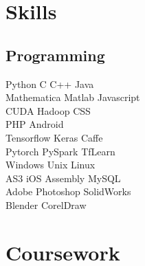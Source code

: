 \documentclass[]{deedy-resume-openfont}
\begin{document}
\begin{minipage}[t]{0.33\textwidth}

\section{Skills}
\subsection{Programming}
 \textbullet{} Python \textbullet{} C \textbullet{} C++ \textbullet{} Java \\

\textbullet{} Mathematica \textbullet{} Matlab \textbullet{} Javascript\\
\textbullet{} CUDA \textbullet{} Hadoop \textbullet{} CSS \\ \textbullet{} PHP \textbullet{} Android \\
\textbullet{} Tensorflow \textbullet{} Keras \textbullet{} Caffe \\
\textbullet{} Pytorch \textbullet{} PySpark \textbullet{} TfLearn \\
\textbullet{} Windows \textbullet{} Unix \textbullet{} Linux \\
AS3 \textbullet{} iOS \textbullet{} Assembly \textbullet{} MySQL\\
\textbullet{} Adobe Photoshop \textbullet{} SolidWorks \\
\textbullet{} Blender \textbullet{} CorelDraw


\sectionsep




\section{Coursework}

\end{minipage}
\end{document}
